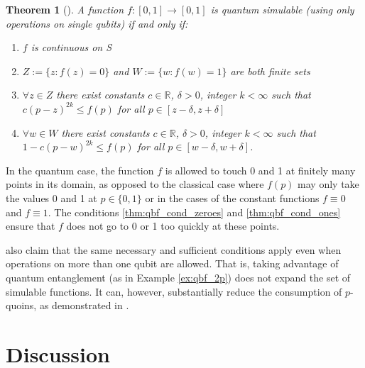 \documentclass{article}
\newtheorem{thm}{Theorem}
\theoremstyle{definition}
\begin{document}
\begin{thm}[{\citet[Theorem 1]{dale2015}}]\label{thm:qbf_simulable}
A function $f:[0,1]\to[0,1]$ %
is quantum simulable (using only operations on single qubits) if and only if:
\begin{enumerate}[label=(\alph*)]
\item $f$ is continuous on S
\item $Z:=\{z:f(z)=0\}$ and $W:=\{w:f(w)=1\}$ are both finite sets
\item\label{thm:qbf_cond_zeroes} $\forall z\in Z$ there exist constants $c\in\mathbb{R}$, $\delta>0$, integer $k<\infty$ such that $c(p-z)^{2k} \leq f(p)$ for all $p \in [z-\delta, z+\delta]$
\item\label{thm:qbf_cond_ones} $\forall w\in W$ there exist constants $c\in\mathbb{R}$, $\delta>0$, integer $k<\infty$ such that $1 - c(p-w)^{2k} \leq f(p)$ for all $p \in [w-\delta, w+\delta]$.
\end{enumerate}
\end{thm}
In the quantum case, the function $f$ is allowed to touch 0 and 1 at finitely many points in its domain, as opposed to the classical case where $f(p)$ may only take the values 0 and 1 at $p\in\{0,1\}$ or in the cases of the constant functions $f\equiv 0$ and $f\equiv 1$.
The conditions \ref{thm:qbf_cond_zeroes} and \ref{thm:qbf_cond_ones} ensure that $f$ does not go to 0 or 1 too quickly at these points.

\citet{dale2015} also claim that the same necessary and sufficient conditions apply even when operations on more than one qubit are allowed. That is, taking advantage of quantum entanglement (as in Example \ref{ex:qbf_2p}) does not expand the set of simulable functions. It can, however, substantially reduce the consumption of $p$-quoins, as demonstrated in \citet{patel2018}.

\section{Discussion}\label{sec:discussion}
% 


\end{document}
